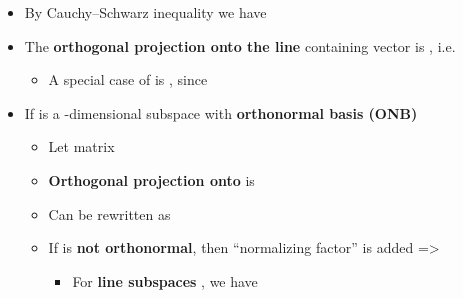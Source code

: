 \begin{itemize}

      \item
            By
            Cauchy--Schwarz inequality we have 
      \item
            The \textbf{orthogonal projection onto the line} containing vector
             is ,
            i.e. 

            \begin{itemize}
                  \item
                        A special case of  is
                        , since
            \end{itemize}
      \item
            If  is a -dimensional
            subspace with \textbf{orthonormal basis (ONB)}

            \begin{itemize}

                  \item
                        Let
                         matrix
                  \item
                        \textbf{Orthogonal projection onto}  is 
                  \item
                        Can be rewritten as
                  \item
                        If  is
                        \textbf{not orthonormal}, then ``normalizing factor''
                         is added =>

                        \begin{itemize}

                              \item
                                    For \textbf{line subspaces} , we
                                    have
                        \end{itemize}
            \end{itemize}
\end{itemize}

